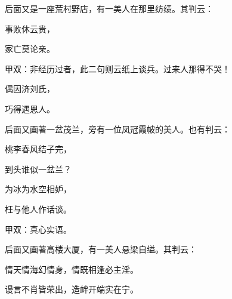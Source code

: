 \begin{parag}
    后面又是一座荒村野店，有一美人在那里纺绩。其判云：
\end{parag}


\begin{poem}
    \begin{pl}事败休云贵，\end{pl}

    \begin{pl}家亡莫论亲。\end{pl}\begin{note}甲双：非经历过者，此二句则云纸上谈兵。过来人那得不哭！\end{note}

    \begin{pl}偶因济刘氏，\end{pl}

    \begin{pl}巧得遇恩人。\end{pl}

\end{poem}


\begin{parag}
    后面又画著一盆茂兰，旁有一位凤冠霞帔的美人。也有判云：
\end{parag}


\begin{poem}
    \begin{pl}桃李春风结子完，\end{pl}

    \begin{pl}到头谁似一盆兰？\end{pl}

    \begin{pl}为冰为水空相妒，\end{pl}

    \begin{pl}枉与他人作话谈。\end{pl}\begin{note}甲双：真心实语。\end{note}

\end{poem}


\begin{parag}
    后面又画著高楼大厦，有一美人悬梁自缢。其判云：
\end{parag}


\begin{poem}
    \begin{pl}情天情海幻情身，情既相逢必主淫。\end{pl}

    \begin{pl}谩言不肖皆荣出，造衅开端实在宁。\end{pl}
\end{poem}


